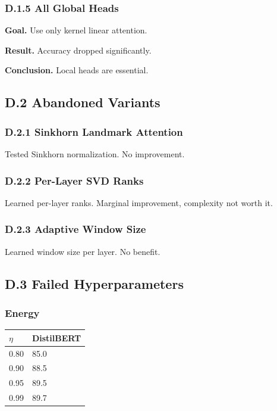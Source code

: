\subsubsection{D.1.5 All Global Heads}

\textbf{Goal.} Use only kernel linear attention.

\textbf{Result.} Accuracy dropped significantly.

\textbf{Conclusion.} Local heads are essential.

\subsection{D.2 Abandoned Variants}

\subsubsection{D.2.1 Sinkhorn Landmark Attention}

Tested Sinkhorn normalization. No improvement.

\subsubsection{D.2.2 Per-Layer SVD Ranks}

Learned per-layer ranks. Marginal improvement, complexity not worth it.

\subsubsection{D.2.3 Adaptive Window Size}

Learned window size per layer. No benefit.

\subsection{D.3 Failed Hyperparameters}

\subsubsection{Energy}

\begin{table}[H]
\centering
\small
\begin{tabular}{ll}
\toprule
\textbf{$\eta$} & \textbf{DistilBERT} \\
\midrule
0.80 & 85.0 \\
0.90 & 88.5 \\
0.95 & 89.5 \\
0.99 & 89.7 \\
\bottomrule
\end{tabular}
\end{table}

